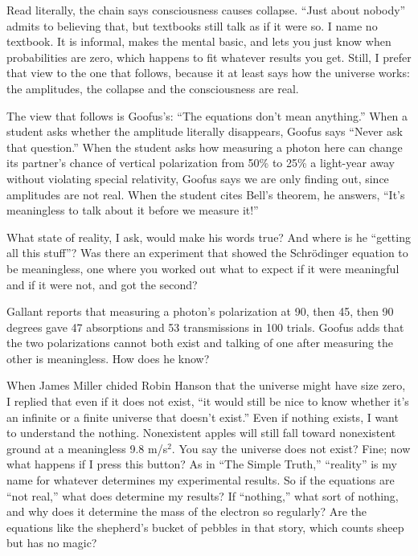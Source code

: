 Read literally, the chain says consciousness causes collapse. ``Just about nobody'' admits to believing that, but textbooks still talk as if it were so. I name no textbook. It is informal, makes the mental basic, and lets you just know when probabilities are zero, which happens to fit whatever results you get. Still, I prefer that view to the one that follows, because it at least says how the universe works: the amplitudes, the collapse and the consciousness are real.

The view that follows is Goofus's: ``The equations don't mean anything.'' When a student asks whether the amplitude literally disappears, Goofus says ``Never ask that question.'' When the student asks how measuring a photon here can change its partner's chance of vertical polarization from 50\% to 25\% a light-year away without violating special relativity, Goofus says we are only finding out, since amplitudes are not real. When the student cites Bell's theorem, he answers, ``It's meaningless to talk about it before we measure it!''

What state of reality, I ask, would make his words true? And where is he ``getting all this stuff''? Was there an experiment that showed the Schrödinger equation to be meaningless, one where you worked out what to expect if it were meaningful and if it were not, and got the second?

Gallant reports that measuring a photon's polarization at 90, then 45, then 90 degrees gave 47 absorptions and 53 transmissions in 100 trials. Goofus adds that the two polarizations cannot both exist and talking of one after measuring the other is meaningless. How does he know? 

When James Miller chided Robin Hanson that the universe might have size zero, I replied that even if it does not exist, ``it would still be nice to know whether it's an infinite or a finite universe that doesn't exist.'' Even if nothing exists, I want to understand the nothing. Nonexistent apples will still fall toward nonexistent ground at a meaningless 9.8 m/s$^2$. You say the universe does not exist? Fine; now what happens if I press this button? As in ``The Simple Truth,'' ``reality'' is my name for whatever determines my experimental results. So if the equations are ``not real,'' what does determine my results? If ``nothing,'' what sort of nothing, and why does it determine the mass of the electron so regularly? Are the equations like the shepherd's bucket of pebbles in that story, which counts sheep but has no magic?

